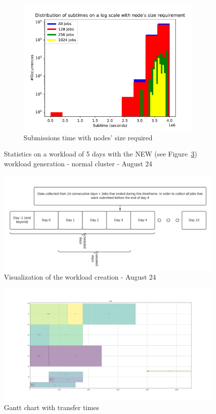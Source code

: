 \documentclass[a4paper]{article}
\begin{document}
\begin{figure}[H]
\begin{subfigure}[b]{0.4\linewidth}\centering\includegraphics[width=1\linewidth]{MBSS/plot/Distribution/2022-01-17->2022-01-19_subtime_with_nodes_size.pdf}\caption{Submissions time with nodes' size required}\label{42}\end{subfigure}
\caption{Statistics on a workload of 5 days with the NEW (see Figure~\ref{44}) workload generation - normal cluster - August 24}\label{43}\end{figure}
\begin{figure}[H]\centering\includegraphics[width=1\linewidth]{Images/Workload_generation.png}\caption{Visualization of the workload creation - August 24}\label{44}\end{figure}
\begin{figure}[H]\centering\includegraphics[width=1\linewidth]{MBSS/plot/Gantt_charts/Fcfs_with_transfer_time.png}\caption{Gantt chart with transfer times}\label{31}\end{figure}
\end{document}
